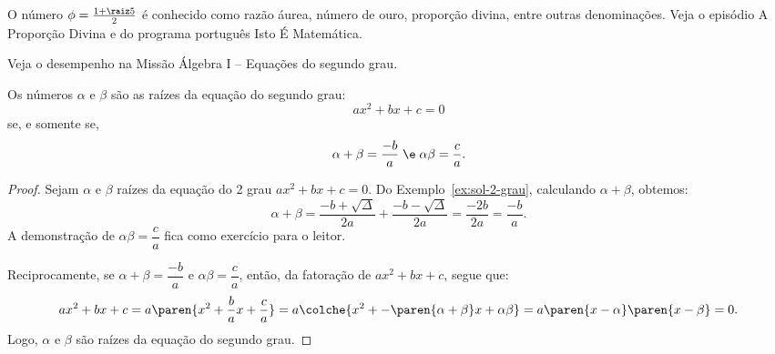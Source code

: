 \begin{remark}
    O número $\phi = \frac {1 + \raiz 5} 2$ é conhecido como razão áurea, número de ouro, proporção divina, entre outras denominações.
    Veja o episódio A Proporção Divina  e  do programa português Isto É Matemática.
\end{remark}

\begin{onlineact}
    Veja o desempenho na Missão Álgebra I -- Equações do segundo grau.
\end{onlineact}

\begin{theorem}
    Os números $\alpha$ e $\beta$ são as raízes da equação do segundo grau:
    \[
        ax^2 + bx + c = 0
    \]
    se, e somente se,
    \[
        \alpha + \beta = \dfrac {-b} a \; \e \; \alpha \beta = \dfrac c a.
    \]
\end{theorem}

\begin{proof}
    Sejam $\alpha$ e $\beta$ raízes da equação do 2\tdeg{} grau $ax^2 + bx + c = 0$. Do Exemplo~\ref{ex:sol-2-grau}, calculando $\alpha+\beta$, obtemos:
    \[
        \alpha+\beta = \dfrac{-b+\sqrt\Delta}{2a}+\dfrac{-b-\sqrt\Delta}{2a} = \dfrac{-2b}{2a}=\dfrac{-b}{a}.
    \]
    A demonstração de $\alpha\beta = \dfrac c a$ fica como exercício para o leitor.

    Reciprocamente, se $\alpha+\beta = \dfrac {-b} a$ e $\alpha\beta = \dfrac c a$, então, da fatoração de $ax^2 + bx + c$, segue que:
    \[
        ax^2 + bx + c = a\paren{x^2 + \frac {b} a x+ \frac c a} = a\colche{x^2 + -\paren{\alpha+\beta} x+ \alpha\beta} = a\paren{x - \alpha}\paren{x - \beta} = 0.
    \]
    Logo, $\alpha$ e $\beta$ são raízes da equação do segundo grau.
\end{proof}